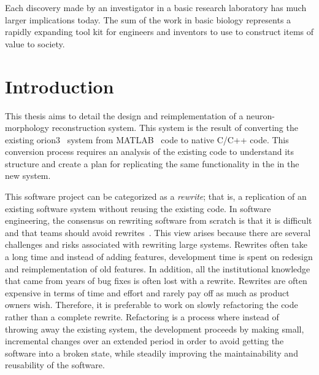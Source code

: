 \begin{savequote}[0.55\linewidth]
	\begin{fancyquote}
		Each discovery made by an investigator in a basic research
		laboratory has much larger implications today. The sum of the work in basic
		biology represents a rapidly expanding tool kit for engineers and inventors to
		use to construct items of value to society.
	\end{fancyquote}
\end{savequote}
\chapter{Introduction}\label{ch:introduction}


This thesis aims to detail the design and reimplementation of a
neuron-morphology reconstruction system. This system is the result of
converting the existing \gls{orion3}~\autocite{ORION_Santamaria-Pang2015} system from
MATLAB~\autocite{MATLAB:2013a} code to native C/C++ code.
This conversion process requires an analysis of the existing code
to understand its structure and create a plan for replicating the
same functionality in the in the new system.

This software project can be categorized as a \emph{rewrite}; that
is, a replication of an existing software system without
reusing the existing code. In software engineering, the consensus
on rewriting software from scratch is that it is difficult and
that teams should avoid rewrites~\autocite{Software-rewrites:Spolsky:2000}. This view
arises because there are several challenges and risks associated
with rewriting large systems.
	Rewrites often take a long time and instead of adding
	features, development time is spent on redesign and
	reimplementation of old features.
	In addition, all the institutional knowledge that came from
	years of bug fixes is often lost with a rewrite.
	Rewrites are often expensive in terms of time and effort and
	rarely pay off as much as product owners wish.
Therefore, it is preferable to work on slowly refactoring the code
rather than a complete rewrite. Refactoring is a process where
instead of throwing away the existing system, the development
proceeds by making small, incremental changes over an extended
period in order to avoid getting the software into a broken state,
while steadily improving the maintainability and reusability of the
software.

